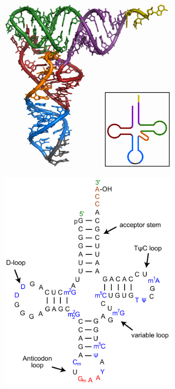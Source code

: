 \begin{figure}
     \centering
     \begin{subfigure}[b]{0.4\textwidth}
         \centering
         \includegraphics[width=\textwidth]{figures/chap3/TRNA-Phe_yeast_1ehz.png}
         \caption{}
         \label{fig:tRNA_3d_struct}
     \end{subfigure}
     \hfill
     \begin{subfigure}[b]{0.3\textwidth}
         \centering
         \includegraphics[width=\textwidth]{figures/chap3/TRNA-Phe_yeast_en.png}

\end{subfigure}
\end{figure}
